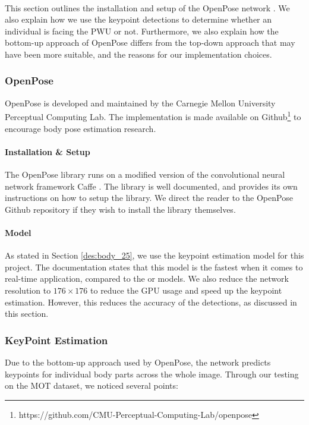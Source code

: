 \paragraph{} This section outlines the installation and setup of the OpenPose network \cite{Shao}. We also explain how we use the keypoint detections to determine whether an individual is facing the PWU or not. Furthermore, we also explain how the bottom-up approach of OpenPose differs from the top-down approach that may have been more suitable, and the reasons for our implementation choices.

\subsubsection{OpenPose}
OpenPose is developed and maintained by the Carnegie Mellon University Perceptual Computing Lab. The implementation is made available on Github\footnote{https://github.com/CMU-Perceptual-Computing-Lab/openpose} to encourage body pose estimation research.

\paragraph{Installation \& Setup} The OpenPose library runs on a modified version of the convolutional neural network framework Caffe \cite{Jia}. The library is well documented, and provides its own instructions on how to setup the library. We direct the reader to the OpenPose Github repository if they wish to install the library themselves.

\paragraph{Model} As stated in Section \ref{des:body_25}, we use the  keypoint estimation model for this project. The documentation states that this model is the fastest when it comes to real-time application, compared to the  or  models. We also reduce the network resolution to $176\times 176$ to reduce the GPU usage and speed up the keypoint estimation. However, this reduces the accuracy of the detections, as discussed in this section.

\subsubsection{KeyPoint Estimation} \label{sec:bottomUp} 
Due to the bottom-up approach used by OpenPose, the network predicts keypoints for individual body parts across the whole image. Through our testing on the MOT dataset, we noticed several points:


